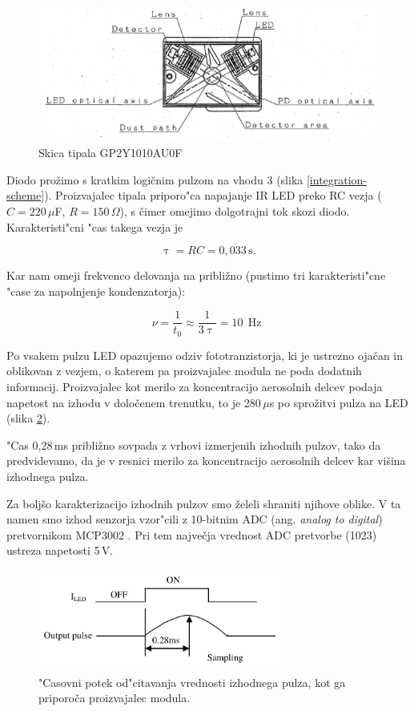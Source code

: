 \documentclass[12pt,a4paper]{article}
\DeclareMathOperator{\Hz}{Hz}
\begin{document}
\begin{figure}[H]
	\begin{center}
		\includegraphics[width=12cm]{sensor-scheme.png}
		\caption{Skica tipala GP2Y1010AU0F}
		\label{sensor-scheme}
	\end{center}
\end{figure}

Diodo prožimo s kratkim logičnim pulzom na vhodu 3 (slika \ref{integration-scheme}). 
Proizvajalec tipala priporo"ca \cite{sharp-gp2y1010au0f} napajanje IR LED preko RC vezja ($C=220\,\mu$F, $R=150\,\Omega$), s čimer omejimo dolgotrajni tok skozi diodo.  
Karakteristi"cni "cas takega vezja je

$$
\uptau = RC = 0,033\,\mathrm{s}.
$$

Kar nam omeji frekvenco delovanja na približno (pustimo tri karakteristi"cne "case za napolnjenje kondenzatorja):

$$
\nu = \frac{1}{t_0} \approx \frac{1}{3 \uptau} = 10\,\Hz
$$

Po vsakem pulzu LED opazujemo odziv fototranzistorja, ki je ustrezno ojačan in oblikovan z vezjem, o katerem pa proizvajalec modula ne poda dodatnih informacij. Proizvajalec kot merilo za koncentracijo aerosolnih delcev podaja napetost na izhodu v določenem trenutku, to je 280\,$\mu$s po sprožitvi pulza na LED (slika \ref{sampling-graph}).

 "Cas 0,28\,ms približno sovpada z vrhovi izmerjenih izhodnih pulzov, tako da predvidevamo, da je v resnici merilo za koncentracijo aerosolnih delcev kar višina izhodnega pulza.
 
 Za boljšo karakterizacijo izhodnih pulzov smo želeli shraniti njihove oblike. V ta namen smo izhod senzorja vzor"cili z 10-bitnim ADC (ang. \textit{analog to digital}) pretvornikom MCP3002 \cite{mcp3002}. Pri tem največja vrednost ADC pretvorbe (1023) ustreza napetosti 5\,V.

\begin{figure}[H]
	\begin{center}
		\includegraphics[width=8cm]{sampling_graph.png}
		\caption{"Casovni  potek od"citavanja vrednosti izhodnega pulza, kot ga priporoča proizvajalec modula.}
		\label{sampling-graph}
	\end{center}
\end{figure}
\end{document}
